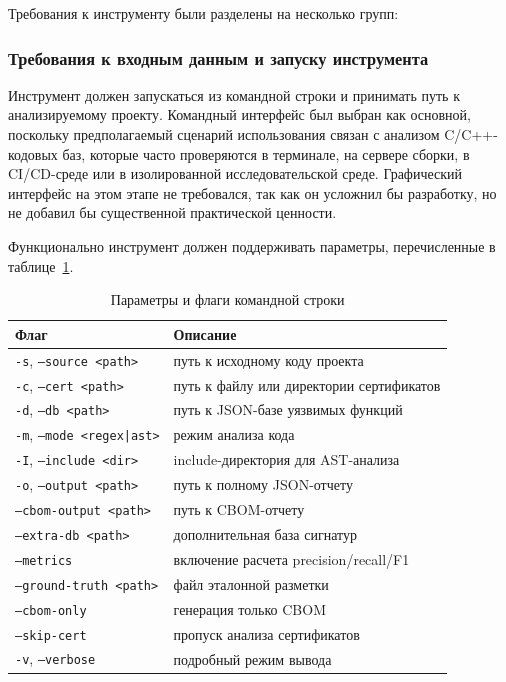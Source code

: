 \documentclass{itmo-vkr}
\begin{document}
	Требования к инструменту были разделены на несколько групп:
	
	\subsubsection{Требования к входным данным и запуску инструмента}
	
	Инструмент должен запускаться из командной строки и принимать путь к анализируемому проекту. Командный интерфейс был выбран как основной, поскольку предполагаемый сценарий использования связан с анализом C/C++-кодовых баз, которые часто проверяются в терминале, на сервере сборки, в CI/CD-среде или в изолированной исследовательской среде. Графический интерфейс на этом этапе не требовался, так как он усложнил бы разработку, но не добавил бы существенной практической ценности.
	
	Функционально инструмент должен поддерживать параметры, перечисленные в таблице~\ref{tab:input_params}.
	
	\begin{table}[h]
		\caption{Параметры и флаги командной строки}
		\label{tab:input_params}
		\begin{tabular}{|l|p{9.5cm}|}
			\hline
			Флаг & Описание \\ \hline
			\texttt{-s}, \texttt{--source <path>} & путь к исходному коду проекта \\ \hline
			\texttt{-c}, \texttt{--cert <path>} & путь к файлу или директории сертификатов \\ \hline
			\texttt{-d}, \texttt{--db <path>} & путь к JSON-базе уязвимых функций \\ \hline
			\texttt{-m}, \texttt{--mode <regex|ast>} & режим анализа кода \\ \hline
			\texttt{-I}, \texttt{--include <dir>} & include-директория для AST-анализа \\ \hline
			\texttt{-o}, \texttt{--output <path>} & путь к полному JSON-отчету \\ \hline
			\texttt{--cbom-output <path>} & путь к CBOM-отчету \\ \hline
			\texttt{--extra-db <path>} & дополнительная база сигнатур \\ \hline
			\texttt{--metrics} & включение расчета precision/recall/F1 \\ \hline
			\texttt{--ground-truth <path>} & файл эталонной разметки \\ \hline
			\texttt{--cbom-only} & генерация только CBOM \\ \hline
			\texttt{--skip-cert} & пропуск анализа сертификатов \\ \hline
			\texttt{-v}, \texttt{--verbose} & подробный режим вывода \\ \hline
		\end{tabular}
	\end{table}
	
\end{document}
